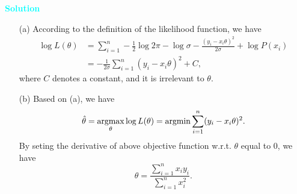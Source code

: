\documentclass[10pt]{article}
\newenvironment{solution}
    { \begin{mdframed}[backgroundcolor=gray!10] \textcolor{cyan}{\textbf{Solution}} \\}
    {  \end{mdframed}}
\begin{document}
\begin{enumerate}
	      \begin{solution}
		      \begin{itemize}
			      \item[(a)] According to the definition of the likelihood function, we have
			            \begin{align}
				            \log L(\theta) & = \sum_{i=1}^n -\frac{1}{2}\log 2\pi - \log \sigma - \frac{(y_i-x_i\theta)^2}{2\sigma} + \log P(x_i) \nonumber \\
				                           & = -\frac{1}{2\sigma} \sum_{i=1}^n(y_i-x_i\theta)^2 + C,
			            \end{align}
			            where $C$ denotes a constant, and it is irrelevant to $\theta$.
			      \item[(b)]
			            Based on (a), we have
			            \begin{equation}
				            \hat{\theta} = \mathop{\rm argmax}_{\theta} \log L(\theta) = \mathop{\rm argmin} \sum_{i=1}^n (y_i-x_i\theta)^2.
			            \end{equation}
			            By seting the derivative of above objective function w.r.t. $\theta$ equal to 0, we have
			            \begin{equation}
				            \theta = \frac{\sum_{i=1}^n x_i y_i}{\sum_{i=1}^n x_i^2}.
			            \end{equation}
		      \end{itemize}
	      \end{solution}

\end{enumerate}

\end{document}
